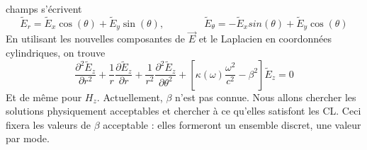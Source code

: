 champs s'écrivent
\begin{equation}
{\tilde E_r} = {\tilde E_x}\cos (\theta ) + {\tilde E_y}\sin (\theta ),\qquad\qquad
{\tilde E_\theta } =  - {\tilde E_x}sin(\theta ) + {\tilde E_y}\cos (\theta )
\end{equation}
En utilisant les nouvelles composantes de $\vec{E}$ et le Laplacien en coordonnées cylindriques, on 
trouve
\begin{equation}
\frac{{{\partial ^2}{{\tilde E}_z}}}{{\partial {r^2}}} + \frac{1}{r}\frac{{\partial {{\tilde E}_z}}}{{\partial r}} + \frac{1}{{{r^2}}}\frac{{{\partial ^2}{{\tilde E}_z}}}{{\partial {\theta ^2}}} + [\kappa (\omega )\frac{{{\omega ^2}}}{{{c^2}}} - {\beta ^2}]{\tilde E_z} = 0
\end{equation}
Et de même pour $H_z$. Actuellement, $\beta$ n'est pas connue. Nous allons chercher les solutions
physiquement acceptables et chercher à ce qu'elles satisfont les CL. Ceci fixera les valeurs de 
$\beta$ acceptable : elles formeront un ensemble discret, une valeur par mode.\\

